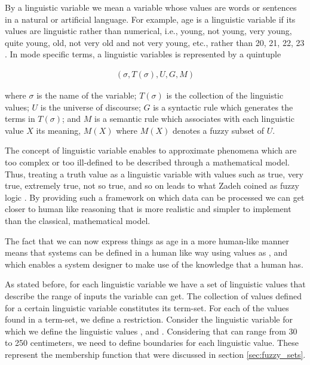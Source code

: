 \qquad By a linguistic variable we mean a variable whose values are words or sentences in a natural or artificial
language. For example, age is a linguistic variable if its values are linguistic rather than numerical, i.e.,
young, not young, very young, quite young, old, not very old and not very young, etc., rather than 20, 21, 22,
23 \cite{ling_vars_zadeh}. In mode specific terms, a linguistic variables is represented by a quintuple

\begin{align}
(\sigma, T(\sigma), U, G, M)
\end{align}

where $\sigma$ is the name of the variable; $T(\sigma)$ is the collection of the
linguistic values; $U$ is the universe of discourse; $G$ is a syntactic rule which generates the terms in
$T(\sigma)$; and $M$ is a semantic rule which associates with each linguistic value $X$ its meaning, $M(X)$
where $M(X)$ denotes a fuzzy subset of $U$.

\qquad The concept of linguistic variable enables to approximate phenomena which are too complex or too ill-defined
to be described through a mathematical model. Thus, treating a truth value as a linguistic variable with
values such as true, very true, extremely true, not so true, and so on leads to what Zadeh coined as fuzzy
logic \cite{ling_vars_zadeh}.
By providing such a framework on which data can be processed we can get closer to human like reasoning that
is more realistic and simpler to implement than the classical, mathematical model.

\qquad The fact that we can now express things as age in a more human-like manner means that systems can be
defined in a human like way using values as ,  and  which
enables a system designer to make use of the knowledge that a human has.

\qquad As stated before, for each linguistic variable we have a set of linguistic values that describe
the range of inputs the variable can get. The collection of values defined for a certain linguistic variable
constitutes its term-set. For each of the values found in a term-set, we define a restriction.
Consider the linguistic variable  for which we define the linguistic values ,
 and . Considering that  can range from 30 to 250 centimeters,
we need to define boundaries for each linguistic value. These represent the membership function that were
discussed in section \ref{sec:fuzzy_sets}.

